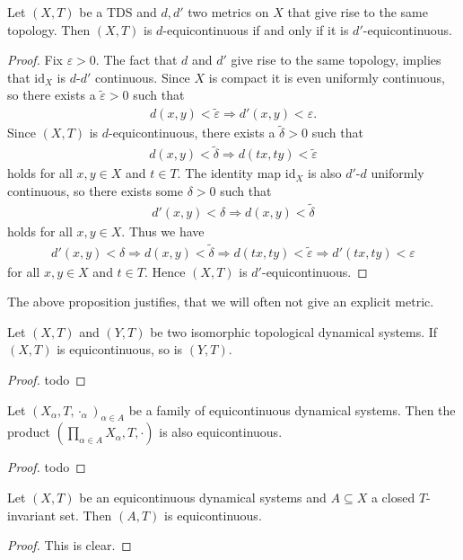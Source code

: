 \begin{proposition}
	Let $(X, T)$ be a TDS and $d, d'$ two metrics on $X$ that give rise to the same topology. Then $(X, T)$ is $d$-equicontinuous if and only if it is $d'$-equicontinuous.
\end{proposition}
\begin{proof}
	Fix $\varepsilon > 0$. The fact that $d$ and $d'$ give rise to the same topology, implies that $\mathrm{id}_X$ is $d$-$d'$ continuous. Since $X$ is compact it is even uniformly continuous, so there exists a $\tilde{\varepsilon} > 0$ such that
	\begin{align*}
		d(x, y) < \tilde{\varepsilon} \Rightarrow d'(x, y) < \varepsilon.
	\end{align*}
	Since $(X, T)$ is $d$-equicontinuous, there exists a $\tilde{\delta} > 0$ such that
	\begin{align*}
		d(x, y) < \tilde{\delta} \Rightarrow d(tx, ty) < \tilde{\varepsilon}
	\end{align*}
	holds for all $x, y \in X$ and $t \in T$. The identity map $\mathrm{id}_X$ is also $d'$-$d$ uniformly continuous, so there exists some $\delta > 0$ such that
	\begin{align*}
		d'(x, y) < \delta \Rightarrow d(x, y) < \tilde{\delta}
	\end{align*}
	holds for all $x, y \in X$. Thus we have
	\begin{align*}
		d'(x, y) < \delta \Rightarrow d(x, y) < \tilde{\delta} \Rightarrow d(tx, ty) < \tilde{\varepsilon} \Rightarrow d'(tx, ty) < \varepsilon
	\end{align*}
	for all $x, y \in X$ and $t \in T$. Hence $(X, T)$ is $d'$-equicontinuous.
\end{proof}

\begin{remark}
	The above proposition justifies, that we will often not give an explicit metric.
\end{remark}

\begin{proposition}
	Let $(X, T)$ and $(Y, T)$ be two isomorphic topological dynamical systems. If $(X, T)$ is equicontinuous, so is $(Y, T)$.
\end{proposition}
\begin{proof}
	todo
\end{proof}

\begin{proposition}
	Let $(X_\alpha, T, \cdot_\alpha)_{\alpha \in A}$ be a family of equicontinuous dynamical systems. Then the product $(\prod_{\alpha \in A} X_\alpha, T, \cdot)$ is also equicontinuous.
\end{proposition}
\begin{proof}
	todo
\end{proof}

\begin{proposition}
	Let $(X, T)$ be an equicontinuous dynamical systems and $A \subseteq X$ a closed $T$-invariant set. Then $(A, T)$ is equicontinuous.
\end{proposition}
\begin{proof}
	This is clear.
\end{proof}